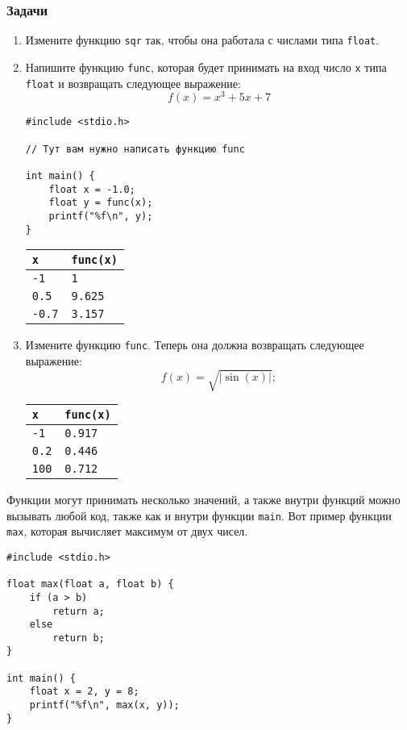 \documentclass{article}
\begin{document}
\subsubsection*{Задачи}
\begin{enumerate}
\item Измените функцию \texttt{sqr} так, чтобы она работала с числами типа \texttt{float}.
\item Напишите функцию \texttt{func}, которая будет принимать на вход число \texttt{x} типа \texttt{float} и возвращать следующее выражение:
$$
f(x) = x^3 + 5 x + 7
$$

\begin{lstlisting}
#include <stdio.h>

// Тут вам нужно написать функцию func

int main() {
    float x = -1.0;
    float y = func(x);
    printf("%f\n", y);
}
\end{lstlisting}

\begin{center}
\begin{tabular}{ l l }
 \texttt{x} & \texttt{func(x)} \\ \hline
 \texttt{-1} & \texttt{1}  \\ 
 \texttt{0.5} & \texttt{9.625}  \\ 
 \texttt{-0.7} & \texttt{3.157}  \\
\end{tabular}
\end{center}
\item Измените функцию \texttt{func}. Теперь она должна возвращать следующее выражение:
$$
f(x) = \sqrt{|\sin(x)|};
$$
\begin{center}
\begin{tabular}{ l l }
 \texttt{x} & \texttt{func(x)} \\ \hline
 \texttt{-1} & \texttt{0.917}  \\ 
 \texttt{0.2} & \texttt{0.446}  \\ 
 \texttt{100} & \texttt{0.712}  \\
\end{tabular}
\end{center}
\end{enumerate}

\newpage
Функции могут принимать несколько значений, а также внутри функций можно вызывать любой код, также как и внутри функции \texttt{main}. Вот пример функции \texttt{max}, которая вычисляет максимум от двух чисел.
\begin{lstlisting}
#include <stdio.h>

float max(float a, float b) {
    if (a > b)
        return a;
    else
        return b;
}

int main() {
    float x = 2, y = 8;
    printf("%f\n", max(x, y));
}
\end{lstlisting}
\end{document}
